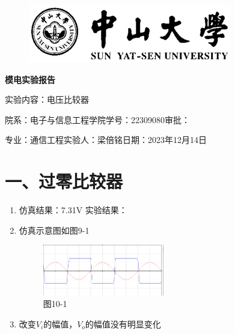 \documentclass[a4paper,10pt,notitlepage]{article}
\begin{document}
	\large
	\onehalfspacing
	\begin{figure}[h]
		\raggedright
		\includegraphics{1.png}
	\end{figure}
	\centering
	{\Huge\textbf{模电实验报告}\par}
	\vspace{0.2cm}
	{\huge{实验内容：电压比较器}\par}
	\raggedright
	\vspace{0.3cm}
	\begin{centering}
		{\large 院系：电子与信息工程学院\hfill 学号：22309080\hfill 审批：\hspace{2cm} \par
			专业：通信工程\hfill 实验人：梁倍铭\hfill 日期：2023年12月14日 \par}
	\end{centering}
	\vspace{0.3cm}
	\section*{一、过零比较器}
	\begin{enumerate}
		\item 仿真结果：7.31V      实验结果：
		\item 仿真示意图如图9-1
		\begin{figure}[h]
			\centering
			\includegraphics[width=0.5\textwidth]{2.png}
			\caption*{图10-1}
		\end{figure}
		\item 改变$V_i$的幅值，$V_o$的幅值没有明显变化
	\end{enumerate}
\end{document}
